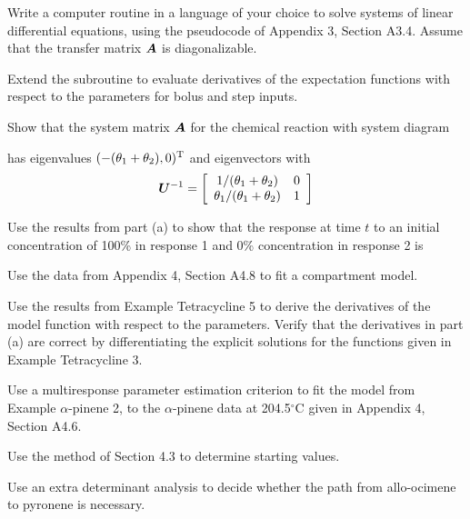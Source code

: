 \begin{problems}

  \prob 

  \subprob Write a computer routine in a language of your choice to
  solve systems of linear differential equations, using the pseudocode
  of Appendix 3, Section A3.4.  Assume that the transfer matrix ${\boldsymbol A}$
  is diagonalizable.

  \subprob Extend the subroutine to evaluate derivatives of the
  expectation functions with respect to the parameters for bolus and
  step inputs.

  \prob

  \subprob 
  Show that the system matrix ${\boldsymbol A}$ for the chemical reaction
  with system diagram
  
  \centerline{\box\graph}
  has eigenvalues $( - ( \theta_1+\theta_2 ) ,0 ) \trans$ and
  eigenvectors
  with
  \begin{displaymath}
  {\boldsymbol U}^{-1}=\left[
    \begin{array}{c c}
      1/(\theta_1+\theta_2)&0\\
      \theta_1/(\theta_1+\theta_2)&1
    \end{array}\right]
  \end{displaymath}

  \subprob Use the results from part (a) to show that the response at
  time $t$ to an initial concentration of 100\% in response 1 and 0\%
  concentration in response 2 is

  \prob Use the data from Appendix 4, Section A4.8 to fit a
  compartment model.

  \prob

  \subprob Use the results from Example Tetracycline 5 to derive the
  derivatives of the model function with respect to the parameters.
  \subprob Verify that the derivatives in part (a) are correct by
  differentiating the explicit solutions for the functions given in
  Example Tetracycline 3.

  \prob Use a multiresponse parameter estimation criterion to fit the
  model from Example $\alpha$-pinene 2, to the
  $\alpha$-pinene data at 204.5$^\circ$C given in Appendix 4,
  Section A4.6.

  \subprob Use the method of Section 4.3 to determine starting values.

  \subprob Use an extra determinant analysis to decide whether the path
  from allo-ocimene to pyronene is necessary.
  
\end{problems}

